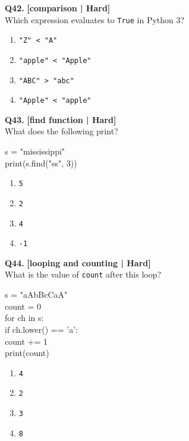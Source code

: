 \noindent\textbf{Q42.} \hfill {\small\color{LPUOrange}\textbf{[comparison | Hard]}}\\[2pt]
Which expression evaluates to \texttt{True} in Python 3?

\begin{enumerate}[label=(\alph*),topsep=2pt,itemsep=1pt,partopsep=0pt,parsep=0pt]
    \item \relax \texttt{"Z" < "A"}
    \item \relax \texttt{"apple" < "Apple"}
    \item \relax \texttt{"ABC" > "abc"}
    \item \relax \texttt{"Apple" < "apple"}
\end{enumerate}
\vspace{2mm}

\noindent\textbf{Q43.} \hfill {\small\color{LPUOrange}\textbf{[find function | Hard]}}\\[2pt]
What does the following print? 

\begin{pycode}
s = "mississippi"\\
print(s.find("ss", 3))
\end{pycode}

\begin{enumerate}[label=(\alph*),topsep=2pt,itemsep=1pt,partopsep=0pt,parsep=0pt]
    \item \relax \texttt{5}
    \item \relax \texttt{2}
    \item \relax \texttt{4}
    \item \relax \texttt{-1}
\end{enumerate}
\vspace{2mm}

\noindent\textbf{Q44.} \hfill {\small\color{LPUOrange}\textbf{[looping and counting | Hard]}}\\[2pt]
What is the value of \texttt{count} after this loop? 

\begin{pycode}
s = "aAbBcCaA"\\
count = 0\\
for ch in s:\\
if ch.lower() == 'a':\\
count += 1\\
print(count)
\end{pycode}

\begin{enumerate}[label=(\alph*),topsep=2pt,itemsep=1pt,partopsep=0pt,parsep=0pt]
    \item \relax \texttt{4}
    \item \relax \texttt{2}
    \item \relax \texttt{3}
    \item \relax \texttt{8}
\end{enumerate}
\vspace{2mm}

